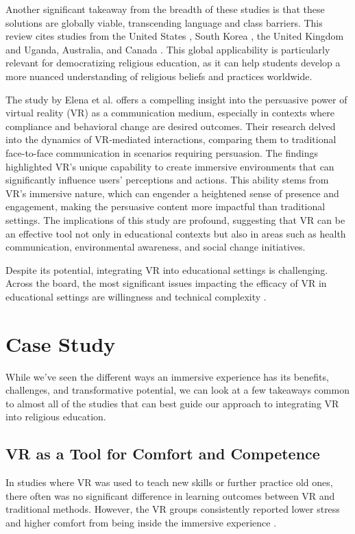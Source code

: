 \documentclass[conference]{IEEEtran}
\begin{document}
Another significant takeaway from the breadth of these studies is that these solutions are globally viable, transcending language and class barriers. This review cites studies from the United States \cite{gleason_developing_2022}, South Korea \cite{an_teachers_2023}, the United Kingdom and Uganda, Australia, and Canada \cite{kyaw_comparing_2023}. This global applicability is particularly relevant for democratizing religious education, as it can help students develop a more nuanced understanding of religious beliefs and practices worldwide.

The study by Elena et al. \cite{elena_virtual_2022} offers a compelling insight into the persuasive power of virtual reality (VR) as a communication medium, especially in contexts where compliance and behavioral change are desired outcomes. Their research delved into the dynamics of VR-mediated interactions, comparing them to traditional face-to-face communication in scenarios requiring persuasion. The findings highlighted VR's unique capability to create immersive environments that can significantly influence users' perceptions and actions. This ability stems from VR's immersive nature, which can engender a heightened sense of presence and engagement, making the persuasive content more impactful than traditional settings. The implications of this study are profound, suggesting that VR can be an effective tool not only in educational contexts but also in areas such as health communication, environmental awareness, and social change initiatives. 

Despite its potential, integrating VR into educational settings is challenging. Across the board, the most significant issues impacting the efficacy of VR in educational settings are willingness and technical complexity \cite{peng_virtual_2020} \cite{gleason_developing_2022} \cite{gomindes_use_2023}.

\section{Case Study}
While we've seen the different ways an immersive experience has its benefits, challenges, and transformative potential, we can look at a few takeaways common to almost all of the studies that can best guide our approach to integrating VR into religious education.

\subsection{VR as a Tool for Comfort and Competence}
In studies where VR was used to teach new skills or further practice old ones, there often was no significant difference in learning outcomes between VR and traditional methods. However, the VR groups consistently reported lower stress and higher comfort from being inside the immersive experience \cite{gleason_developing_2022} \cite{please_virtual_2024}.
\end{document}
